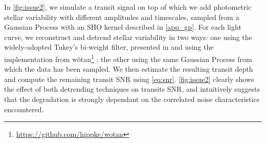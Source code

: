 \documentclass{aastex631}
\begin{document}
In \autoref{fig:issue2}, we simulate a transit signal on top of which we add photometric stellar variability with different amplitudes and timescales, sampled from a Gaussian Process with an SHO kernel described in \autoref{app_gp}. For each light curve, we reconstruct and detrend stellar variability in two ways: one using the widely-adopted Tukey's bi-weight filter, presented in \cite{tukey} and using the implementation from \textsf{wõtan}\footnote{\href{https://github.com/hippke/wotan}{https://github.com/hippke/wotan}} \citep{wotan}; the other using the same Gaussian Process from which the data has been sampled. We then estimate the resulting transit depth and compute the remaining transit SNR using \autoref{eq:snr}. \autoref{fig:issue2} clearly shows the effect of both detrending techniques on transits SNR, and intuitively suggests that the degradation is strongly dependant on the correlated noise characteristics encountered.
\end{document}
